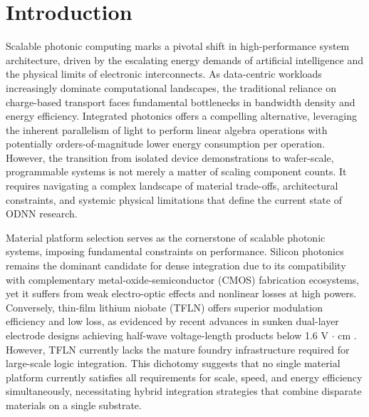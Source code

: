 \section{Introduction}\label{introduction}

Scalable photonic computing marks a pivotal shift in high-performance system architecture, driven by the escalating energy demands of artificial intelligence and the physical limits of electronic interconnects. As data-centric workloads increasingly dominate computational landscapes, the traditional reliance on charge-based transport faces fundamental bottlenecks in bandwidth density and energy efficiency. Integrated photonics offers a compelling alternative, leveraging the inherent parallelism of light to perform linear algebra operations with potentially orders-of-magnitude lower energy consumption per operation. However, the transition from isolated device demonstrations to wafer-scale, programmable systems is not merely a matter of scaling component counts. It requires navigating a complex landscape of material trade-offs, architectural constraints, and systemic physical limitations that define the current state of ODNN research.

Material platform selection serves as the cornerstone of scalable photonic systems, imposing fundamental constraints on performance. Silicon photonics remains the dominant candidate for dense integration due to its compatibility with complementary metal-oxide-semiconductor (CMOS) fabrication ecosystems, yet it suffers from weak electro-optic effects and nonlinear losses at high powers. Conversely, thin-film lithium niobate (TFLN) offers superior modulation efficiency and low loss, as evidenced by recent advances in sunken dual-layer electrode designs achieving half-wave voltage-length products below 1.6 V \(\cdot\) cm \citep{doi_10_3390_photonics12111129_03f4b6cd}. However, TFLN currently lacks the mature foundry infrastructure required for large-scale logic integration. This dichotomy suggests that no single material platform currently satisfies all requirements for scale, speed, and energy efficiency simultaneously, necessitating hybrid integration strategies that combine disparate materials on a single substrate.

